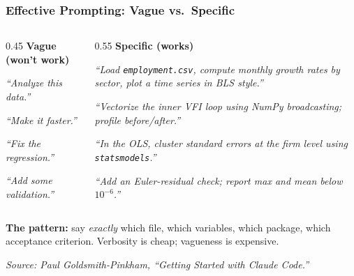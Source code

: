 \documentclass[10pt,english,aspectratio=169]{beamer}
\begin{document}
\begin{frame}
\frametitle{Effective Prompting: Vague vs.\ Specific}

\begin{columns}[T]
\begin{column}{0.45\textwidth}
\textbf{\textcolor{red!70!black}{Vague (won't work)}}

\vspace{0.2cm}

\textit{``Analyze this data.''}

\vspace{0.4cm}

\textit{``Make it faster.''}

\vspace{0.4cm}

\textit{``Fix the regression.''}

\vspace{0.4cm}

\textit{``Add some validation.''}
\end{column}
\begin{column}{0.55\textwidth}
\textbf{\textcolor{green!50!black}{Specific (works)}}

\vspace{0.2cm}

\textit{``Load \texttt{employment.csv}, compute monthly growth rates by sector, plot a time series in BLS style.''}

\vspace{0.2cm}

\textit{``Vectorize the inner VFI loop using NumPy broadcasting; profile before/after.''}

\vspace{0.2cm}

\textit{``In the OLS, cluster standard errors at the firm level using \texttt{statsmodels}.''}

\vspace{0.2cm}

\textit{``Add an Euler-residual check; report max and mean below $10^{-6}$.''}
\end{column}
\end{columns}

\vspace{0.3cm}

\textbf{The pattern:} say \textit{exactly} which file, which variables, which package, which acceptance criterion. Verbosity is cheap; vagueness is expensive.

\textit{Source: Paul Goldsmith-Pinkham, ``Getting Started with Claude Code.''}
\end{frame}
\end{document}
